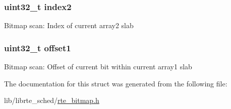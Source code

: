 \subsubsection[{index2}]{\setlength{\rightskip}{0pt plus 5cm}uint32\+\_\+t index2}\label{structrte__bitmap_a1448310cceb53513c1955213ed3918b3}
Bitmap scan\+: Index of current array2 slab \hypertarget{structrte__bitmap_ac9d23fc19363825ef8475d9bd1b1d35e}{}
\subsubsection[{offset1}]{\setlength{\rightskip}{0pt plus 5cm}uint32\+\_\+t offset1}\label{structrte__bitmap_ac9d23fc19363825ef8475d9bd1b1d35e}
Bitmap scan\+: Offset of current bit within current array1 slab 

The documentation for this struct was generated from the following file\+:\begin{DoxyCompactItemize}
\item 
lib/librte\+\_\+sched/\hyperlink{rte__bitmap_8h}{rte\+\_\+bitmap.\+h}\end{DoxyCompactItemize}
